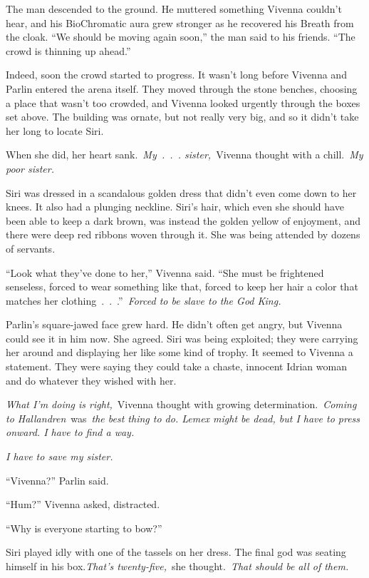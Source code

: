 The man descended to the ground. He muttered something Vivenna couldn’t hear, and his BioChromatic aura grew stronger as he recovered his Breath from the cloak. “We should be moving again soon,” the man said to his friends. “The crowd is thinning up ahead.”

Indeed, soon the crowd started to progress. It wasn’t long before Vivenna and Parlin entered the arena itself. They moved through the stone benches, choosing a place that wasn’t too crowded, and Vivenna looked urgently through the boxes set above. The building was ornate, but not really very big, and so it didn’t take her long to locate Siri.

When she did, her heart sank.~\textit{My~.~.~. sister,}~Vivenna thought with a chill.~\textit{My poor sister.}

Siri was dressed in a scandalous golden dress that didn’t even come down to her knees. It also had a plunging neckline. Siri’s hair, which even she should have been able to keep a dark brown, was instead the golden yellow of enjoyment, and there were deep red ribbons woven through it. She was being attended by dozens of servants.

“Look what they’ve done to her,” Vivenna said. “She must be frightened senseless, forced to wear something like that, forced to keep her hair a color that matches her clothing~.~.~.”~\textit{Forced to be slave to the God King.}

Parlin’s square-jawed face grew hard. He didn’t often get angry, but Vivenna could see it in him now. She agreed. Siri was being exploited; they were carrying her around and displaying her like some kind of trophy. It seemed to Vivenna a statement. They were saying they could take a chaste, innocent Idrian woman and do whatever they wished with her.

\textit{What I’m doing is right,}~Vivenna thought with growing determination.~\textit{Coming to Hallandren}~was~\textit{the best thing to do. Lemex might be dead, but I have to press onward. I have to find a way.}

\textit{I have to save my sister.}

“Vivenna?” Parlin said.

“Hum?” Vivenna asked, distracted.

“Why is everyone starting to bow?”

\orn

Siri played idly with one of the tassels on her dress. The final god was seating himself in his box.\textit{That’s twenty-five,}~she thought.~\textit{That should be all of them.}


